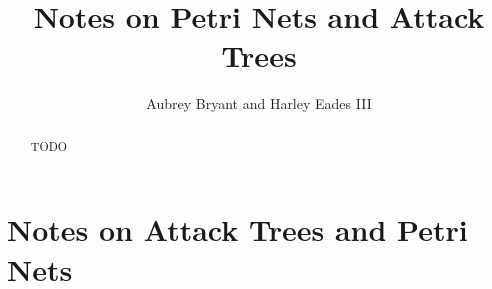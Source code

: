 \documentclass{article}
\title{Notes on Petri Nets and Attack Trees}
\author{Aubrey Bryant and Harley Eades III}
\begin{document}
\maketitle 

\begin{abstract}
  TODO
\end{abstract}

\section{Notes on Attack Trees and Petri Nets}

\nocite{*}


\end{document}
